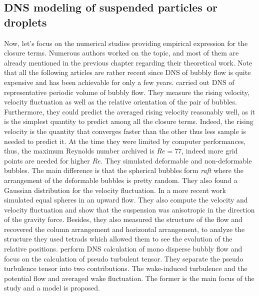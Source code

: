 \subsection{DNS modeling of suspended particles or droplets}

Now, let's focus on the numerical studies providing empirical expression for the closure terms. 
Numerous authors worked on the topic, and most of them are already mentioned in the previous chapter regarding their theoretical work. 
Note that all the following articles are rather recent since DNS of bubbly flow is quite expensive and has been achievable for only a few years. 
\citet{esmaeeli2005direct} carried out  DNS of representative periodic volume of bubbly flow. 
They measure the rising velocity, velocity fluctuation as well as the relative orientation of the pair of bubbles.
Furthermore, they could predict the averaged rising velocity reasonably well, as it is the simplest quantity to predict among all the closure terms.
Indeed, the rising velocity is the quantity that converges faster than the other thus less sample is needed to predict it.
At the time they were limited by computer performances, thus, the maximum Reynolds number archived is $Re  = 77$, indeed more grid points are needed for higher $Re$. 
They simulated deformable and non-deformable bubbles.
The main difference is that the spherical bubbles form \textit{raft} where the arrangement of the deformable bubbles is pretty random. 
They also found a Gaussian distribution for the velocity fluctuation.
In a more recent work \citet{willen2019resolved} simulated equal spheres in an upward flow.
They also compute the velocity and velocity fluctuation and show that the suspension was anisotropic in the direction of the gravity force.
Besides, they also measured the structure of the flow and recovered the column arrangement and horizontal arrangement, to analyze the structure they used tetrads which allowed them to see the evolution of the relative positions.
\citet{du2022analysis} perform DNS calculation of mono disperse bubbly flow and focus on the calculation of pseudo turbulent tensor. 
They separate the pseudo turbulence tensor into two contributions.
The wake-induced turbulence and the potential flow and averaged wake fluctuation.
The former is the main focus of the study and a model is proposed.
